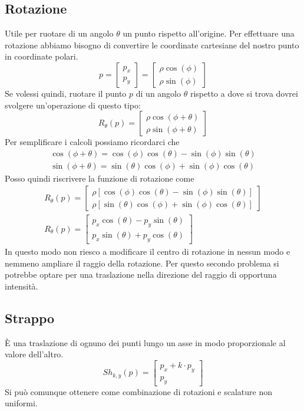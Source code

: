 \subsection{Rotazione}
Utile per ruotare di un angolo $\theta$ un punto rispetto all'origine. Per
effettuare una rotazione abbiamo bisogno di convertire le coordinate cartesiane del
nostro punto in coordinate polari.
\[
	p = \begin{bmatrix}
		p_x \\ p_y
	\end{bmatrix} =
	\begin{bmatrix}
		\rho \cos(\phi) \\
		\rho \sin(\phi)
	\end{bmatrix}\]
Se volessi quindi, ruotare il punto $p$ di un angolo $\theta$ rispetto a dove si trova
dovrei svolgere un'operazione di questo tipo:
\[
	R_\theta(p) =
	\begin{bmatrix}
		\rho \cos(\phi + \theta) \\
		\rho \sin(\phi + \theta)
	\end{bmatrix}
\]
Per semplificare i calcoli possiamo ricordarci che
\begin{gather*}
	\cos(\phi + \theta) = \cos(\phi) \cos(\theta) - \sin(\phi) \sin(\theta) \\
	\sin(\phi + \theta) = \sin(\theta) \cos(\phi) + \sin(\phi) \cos(\theta)
\end{gather*}
Posso quindi riscrivere la funzione di rotazione come
\begin{gather*}
	R_\theta(p) =
	\begin{bmatrix}
		\rho [ \cos(\phi) \cos(\theta) - \sin(\phi) \sin(\theta) ] \\
		\rho [ \sin(\theta) \cos(\phi) + \sin(\phi) \cos(\theta) ]
	\end{bmatrix} \\
	R_\theta(p) = \begin{bmatrix}
		p_x \cos(\theta) - p_y \sin(\theta) \\
		p_x \sin(\theta) + p_y \cos(\theta)
	\end{bmatrix}
\end{gather*}
In questo modo non riesco a modificare il centro di rotazione in nessun modo e nemmeno
ampliare il raggio della rotazione. Per questo secondo problema si potrebbe optare
per una traslazione nella direzione del raggio di opportuna intensit\`a.

\subsection{Strappo}
\`E una traslazione di ognuno dei punti lungo un asse in modo proporzionale al valore
dell'altro.
\[
	Sh_{k, y}(p) =
	\begin{bmatrix}
		p_x + k \cdot p_y \\
		p_y
	\end{bmatrix}
\]
Si pu\`o comunque ottenere come combinazione di rotazioni e scalature non uniformi.

